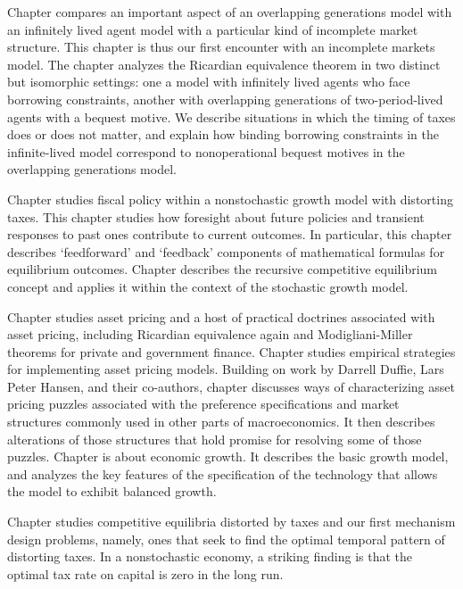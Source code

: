 Chapter  compares an important aspect
of an overlapping generations model with
an infinitely lived agent  model  with a particular
kind of incomplete market structure.  This chapter is thus
our first  encounter with an incomplete markets model.
The chapter analyzes the Ricardian equivalence  theorem in two distinct
but isomorphic settings:  one a model with infinitely lived
agents who face borrowing constraints, another with overlapping generations
of two-period-lived agents with a bequest motive.    We describe
situations in which the timing of taxes does or does not
matter, and explain how binding borrowing
constraints in the infinite-lived model correspond
to nonoperational bequest motives in the overlapping generations
model.

Chapter  studies fiscal policy within a nonstochastic growth model with
distorting taxes.  This chapter studies  how foresight about future policies and
transient responses to past ones contribute to current outcomes. In particular, this chapter describes
`feedforward' and `feedback' components of mathematical formulas  for equilibrium outcomes.
Chapter  describes the recursive competitive equilibrium concept and applies it within the context of
the stochastic growth model.

Chapter  studies asset pricing  and a host of practical
doctrines associated with asset pricing, including
Ricardian equivalence again and Modigliani-Miller theorems
for private and government finance. Chapter  studies empirical strategies
for implementing asset pricing models. Building on work by Darrell Duffie, Lars Peter Hansen,  and their co-authors,  chapter   discusses  ways of characterizing asset pricing puzzles
associated with the preference specifications and market structures commonly used in other parts of macroeconomics.
It then describes alterations of those structures that hold promise for  resolving some of those puzzles.
%
%
Chapter  is about economic growth.  It describes
the basic growth model, and analyzes the key features
of the  specification of  the technology that allows
the model to exhibit balanced growth.

 Chapter  studies competitive
equilibria distorted by taxes  and our first
mechanism design problems, namely,
ones that seek to find the optimal temporal pattern of
distorting taxes. In a nonstochastic economy, a
striking finding is that the optimal tax rate on capital
is zero in the long run.


